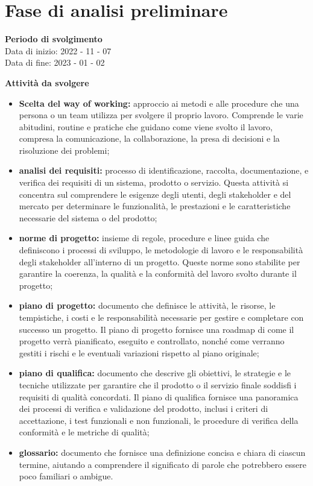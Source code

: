 \section{Fase di analisi preliminare}

\textbf{Periodo di svolgimento}
\\ Data di inizio: 2022 - 11 - 07 \\ Data di fine: 2023 - 01 - 02

\textbf{Attività da svolgere}
    \begin{itemize}
        \item \textbf{Scelta del way of working:} approccio ai metodi e alle procedure che una persona o un team utilizza per svolgere il proprio lavoro. Comprende le varie abitudini, routine e pratiche che guidano come viene svolto il lavoro, compresa la comunicazione, la collaborazione, la presa di decisioni e la risoluzione dei problemi;
        \item \textbf{analisi dei requisiti:} processo di identificazione, raccolta, documentazione, e verifica dei requisiti di un sistema, prodotto o servizio. Questa attività si concentra sul comprendere le esigenze degli utenti, degli stakeholder e del mercato per determinare le funzionalità, le prestazioni e le caratteristiche necessarie del sistema o del prodotto;
        \item \textbf{norme di progetto:} insieme di regole, procedure e linee guida che definiscono i processi di sviluppo, le metodologie di lavoro e le responsabilità degli stakeholder all'interno di un progetto. Queste norme sono stabilite per garantire la coerenza, la qualità e la conformità del lavoro svolto durante il progetto;
        \item \textbf{piano di progetto:} documento che definisce le attività, le risorse, le tempistiche, i costi e le responsabilità necessarie per gestire e completare con successo un progetto. Il piano di progetto fornisce una roadmap di come il progetto verrà pianificato, eseguito e controllato, nonché come verranno gestiti i rischi e le eventuali variazioni rispetto al piano originale;
        \item \textbf{piano di qualifica:} documento che descrive gli obiettivi, le strategie e le tecniche utilizzate per garantire che il prodotto o il servizio finale soddisfi i requisiti di qualità concordati. Il piano di qualifica fornisce una panoramica dei processi di verifica e validazione del prodotto, inclusi i criteri di accettazione, i test funzionali e non funzionali, le procedure di verifica della conformità e le metriche di qualità;
        \item \textbf{glossario:} documento che fornisce una definizione concisa e chiara di ciascun termine, aiutando a comprendere il significato di parole che potrebbero essere poco familiari o ambigue.
    \end{itemize}

